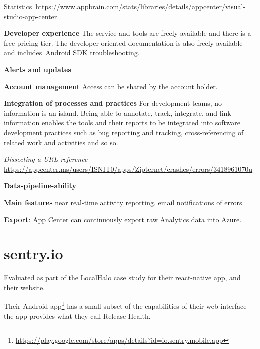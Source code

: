 	

Statistics~\url{https://www.appbrain.com/stats/libraries/details/appcenter/visual-studio-app-center}

\textbf{Developer experience} The service and tools are freely available and there is a free pricing tier. The developer-oriented documentation is also freely available and includes~\href{https://docs.microsoft.com/en-us/appcenter/sdk/troubleshooting/android}{Android SDK troubleshooting}.

\textbf{Alerts and updates} 

\textbf{Account management} Access can be shared by the account holder.

\textbf{Integration of processes and practices} For development teams, no information is an island. Being able to annotate, track, integrate, and link information enables the tools and their reports to be integrated into software development practices such as bug reporting and tracking, cross-referencing of related work and activities and so so.

\emph{Dissecting a URL reference}
\url{https://appcenter.ms/users/ISNIT0/apps/Zipternet/crashes/errors/3418961070u}


\textbf{Data-pipeline-ability}


\textbf{Main features}
near real-time activity reporting.
email notifications of errors.

\href{https://docs.microsoft.com/en-us/appcenter/analytics/export}{\textbf{Export}}: App Center can continuously export raw Analytics data into Azure.

\section{sentry.io}
Evaluated as part of the LocalHalo case study for their react-native app, and their website.

Their Android app\footnote{\url{https://play.google.com/store/apps/details?id=io.sentry.mobile.app}} has a small subset of the capabilities of their web interface - the app provides what they call Release Health.

